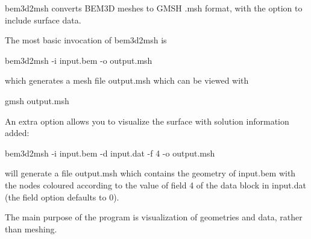 bem3d2msh converts B\+E\+M3\+D meshes to G\+M\+S\+H .msh format, with the option to include surface data.

The most basic invocation of {\ttfamily bem3d2msh} is \begin{DoxyVerb}bem3d2msh -i input.bem -o output.msh \end{DoxyVerb}
 which generates a mesh file {\ttfamily output.\+msh} which can be viewed with \begin{DoxyVerb}gmsh output.msh \end{DoxyVerb}


An extra option allows you to visualize the surface with solution information added\+: \begin{DoxyVerb}bem3d2msh -i input.bem -d input.dat -f 4 -o output.msh \end{DoxyVerb}
 will generate a file {\ttfamily output.\+msh} which contains the geometry of {\ttfamily input.\+bem} with the nodes coloured according to the value of field 4 of the data block in {\ttfamily input.\+dat} (the field option defaults to 0).

The main purpose of the program is visualization of geometries and data, rather than meshing. 